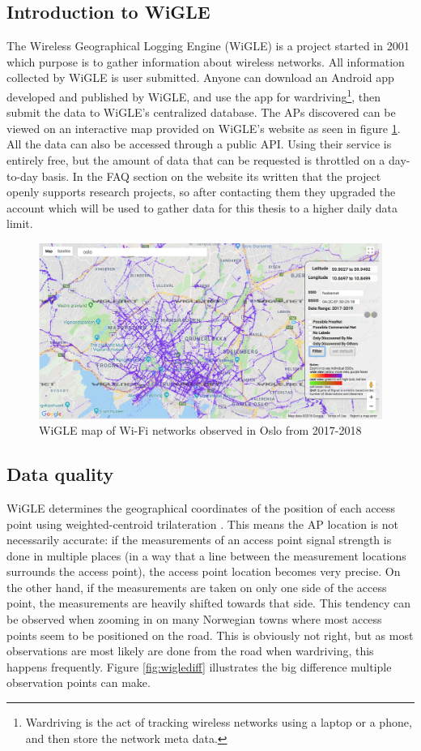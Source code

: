 \subsection{Introduction to WiGLE}
The Wireless Geographical Logging Engine (WiGLE) \cite{wigle} is a project started in 2001 which purpose is to gather information about wireless networks.
All information collected by WiGLE is user submitted. Anyone can download an Android app developed and published by WiGLE, and use the app for wardriving\footnote{Wardriving is the act of tracking wireless networks using a laptop or a phone, and then store the network meta data.},
then submit the data to WiGLE's centralized database. The APs discovered can be viewed on an interactive map provided on WiGLE's website as seen in figure \ref{fig:wigfig}.
All the data can also be accessed through a public API. Using their service is entirely free, but the amount of data that can be requested is throttled on a day-to-day basis.
In the FAQ section on the website its written that the project openly supports research projects, so after contacting them they upgraded the account which will be used to gather data
for this thesis to a higher daily data limit. 

\begin{figure}[h]
	\center
	\includegraphics[scale=0.35]{Images/wigle.png}
	\caption{WiGLE map of Wi-Fi networks observed in Oslo from 2017-2018}
	\label{fig:wigfig}
\end{figure}

\subsection{Data quality}
WiGLE determines the geographical coordinates of the position of each access point using weighted-centroid trilateration \cite{Sharma}. 
This means the AP location is not necessarily accurate:
if the measurements of an access point signal strength is done in multiple places (in a way that a line between the measurement locations surrounds the access point),
the access point location becomes very precise. On the other hand, if the measurements are taken on only one side of the access point,
the measurements are heavily shifted towards that side. This tendency can be observed
when zooming in on many Norwegian towns where most access points seem to be positioned on the road. This is obviously not right, but as most observations
are most likely are done from the road when wardriving, this happens frequently. Figure \ref{fig:wiglediff} illustrates the big difference multiple observation points can make.

